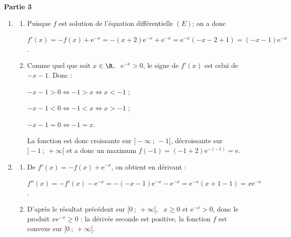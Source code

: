 \bigskip

\begin{center}\textbf{Partie 3}\end{center}



\medskip

\begin{enumerate}
\item 
	\begin{enumerate}
		\item 
Puisque $f$ est solution de l'équation différentielle $(E)$; on a donc 
		
$f'(x) = - f(x) + \text{e}^{-x} = -(x+2)\text{e}^{-x} + \text{e}^{-x} = \text{e}^{-x}(- x - 2 + 1) = (- x - 1)\text{e}^{-x}$.
		\item 




Comme quel que soit $x \in \R$, \, $\text{e}^{-x} > 0$, le signe de $f'(x)$ est celui de $- x - 1$. Donc :

$- x - 1 > 0 \iff - 1 > x \iff x < - 1$ ; 

$- x - 1 < 0 \iff - 1 < x \iff x > - 1$ ;

$- x - 1 = 0 \iff - 1 = x $.

La fonction est donc croissante sur $]- \infty~;~-1[$, décroissante sur $]- 1~;~+ \infty[$ et a donc un maximum $f(- 1) = (- 1 + 2)\text{e}^{-(-1)} = \text{e}$.
	\end{enumerate}
\item 
	\begin{enumerate}
		\item 
		De $f'(x) = -f(x) + \text{e}^{-x}$, on obtient en dérivant :
		
		$f''(x) = - f'(x) - \text{e}^{-x} = - (- x - 1)\text{e}^{-x} - \text{e}^{-x} = \text{e}^{-x}(x + 1 - 1) = x\text{e}^{-x}$.
		\item 
D'après le résultat précédent sur $[0~;~+\infty[$, \, $x \geqslant  0$ et $\text{e}^{-x} > 0$, donc le produit $x \text{e}^{-x} \geqslant 0$ : la dérivée seconde est positive, la fonction $f$ est convexe sur $[0~;~+\infty[$.
	\end{enumerate}
\end{enumerate}

\bigskip
